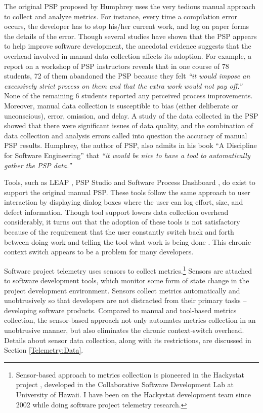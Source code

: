 The original PSP proposed by Humphrey uses the very tedious manual approach to collect and analyze metrics. For instance, every time a compilation error occurs, the developer has to stop his/her current work, and log on paper forms the details of the error. Though several studies \cite{Ferguson:1997, Hayes:1997, Khajenoori:1995} have shown that the PSP appears to help improve software development, the anecdotal evidence suggests that the overhead involved in manual data collection affects its adoption. For example, a report on a workshop of PSP instructors \cite{Borstler:2002} reveals that in one course of 78 students, 72 of them abandoned the PSP because they felt \textit{``it would impose an excessively strict process on them and that the extra work would not pay off.''} None of the remaining 6 students reported any perceived process improvements. Moreover, manual data collection is susceptible to bias (either deliberate or unconscious), error, omission, and delay. A study \cite{Johnson:1998} of the data collected in the PSP showed that there were significant issues of data quality, and the combination of data collection and analysis errors called into question the accuracy of manual PSP results. Humphrey, the author of PSP, also admits in his book ``A Discipline for Software Engineering'' \cite{Humphrey:1995} that \textit{``it would be nice to have a tool to automatically gather the PSP data.''}

Tools, such as LEAP \cite{Moore:1999}, PSP Studio \cite{PspStudio:1997} and Software Process Dashboard \cite{PspDashboard:2000}, do exist to support the original manual PSP. These tools follow the same approach to user interaction by displaying dialog boxes where the user can log effort, size, and defect information. Though tool support lowers data collection overhead considerably, it turns out that the adoption of these tools is not satisfactory because of the requirement that the user constantly switch back and forth between doing work and telling the tool what work is being done \cite{Johnson:2001, Johnson:2003}. This chronic context switch appears to be a problem for many developers.

Software project telemetry uses sensors to collect metrics.\footnote{Sensor-based approach to metrics collection is pioneered in the Hackystat project \cite{Johnson:2003}, developed in the Collaborative Software Development Lab at University of Hawaii. I have been on the Hackystat development team since 2002 while doing software project telemetry research.} Sensors are attached to software development tools, which monitor some form of state change in the project development environment. Sensors collect metrics automatically and unobtrusively so that developers are not distracted from their primary tasks -- developing software products. Compared to manual and tool-based metrics collection, the sensor-based approach not only automates metrics collection in an unobtrusive manner, but also eliminates the chronic context-switch overhead. Details about sensor data collection, along with its restrictions, are discussed in Section \ref{Telemetry:Data}.

